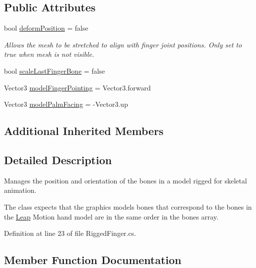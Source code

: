 \subsection*{Public Attributes}
\begin{DoxyCompactItemize}
\item 
bool \mbox{\hyperlink{class_leap_1_1_unity_1_1_rigged_finger_a50f0aac12192993f685d07c551e40151}{deform\+Position}} = false
\begin{DoxyCompactList}\small\item\em Allows the mesh to be stretched to align with finger joint positions. Only set to true when mesh is not visible. \end{DoxyCompactList}\item 
bool \mbox{\hyperlink{class_leap_1_1_unity_1_1_rigged_finger_af154c9566ec146520ae5ec79b949c0d0}{scale\+Last\+Finger\+Bone}} = false
\item 
Vector3 \mbox{\hyperlink{class_leap_1_1_unity_1_1_rigged_finger_a43e360635499f70bc13722e363599c91}{model\+Finger\+Pointing}} = Vector3.\+forward
\item 
Vector3 \mbox{\hyperlink{class_leap_1_1_unity_1_1_rigged_finger_ab8d09b7fb7d2390e19d7f44505dd8dec}{model\+Palm\+Facing}} = -\/Vector3.\+up
\end{DoxyCompactItemize}
\subsection*{Additional Inherited Members}


\subsection{Detailed Description}
Manages the position and orientation of the bones in a model rigged for skeletal animation. 

The class expects that the graphics model\textquotesingle{}s bones that correspond to the bones in the \mbox{\hyperlink{namespace_leap_1_1_unity_1_1_leap}{Leap}} Motion hand model are in the same order in the bones array. 

Definition at line 23 of file Rigged\+Finger.\+cs.



\subsection{Member Function Documentation}
\mbox{\label{class_leap_1_1_unity_1_1_rigged_finger_a559b350e305e18fc0c8cdcbc652a4ec7}} 
